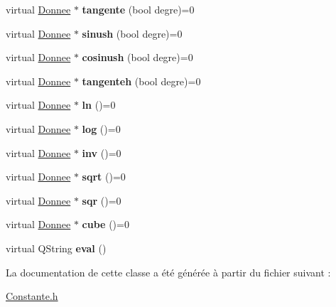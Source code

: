 \begin{DoxyCompactItemize}
\item 
\hypertarget{class_constante_a586760fc3789d45d2fc22c63d5ac0679}{virtual \hyperlink{class_donnee}{Donnee} $\ast$ {\bfseries tangente} (bool degre)=0}\label{class_constante_a586760fc3789d45d2fc22c63d5ac0679}

\item 
\hypertarget{class_constante_a630282a8ee4ff579615eecf06c2bff81}{virtual \hyperlink{class_donnee}{Donnee} $\ast$ {\bfseries sinush} (bool degre)=0}\label{class_constante_a630282a8ee4ff579615eecf06c2bff81}

\item 
\hypertarget{class_constante_af447d1a704ccd3855741328c4ff97300}{virtual \hyperlink{class_donnee}{Donnee} $\ast$ {\bfseries cosinush} (bool degre)=0}\label{class_constante_af447d1a704ccd3855741328c4ff97300}

\item 
\hypertarget{class_constante_a32e1d620c11e78b8318383924a5e9774}{virtual \hyperlink{class_donnee}{Donnee} $\ast$ {\bfseries tangenteh} (bool degre)=0}\label{class_constante_a32e1d620c11e78b8318383924a5e9774}

\item 
\hypertarget{class_constante_a63658ad4998f3b122b9f4f9f02a4f525}{virtual \hyperlink{class_donnee}{Donnee} $\ast$ {\bfseries ln} ()=0}\label{class_constante_a63658ad4998f3b122b9f4f9f02a4f525}

\item 
\hypertarget{class_constante_a6d96efcf73d825f28c9d3d155ecc983a}{virtual \hyperlink{class_donnee}{Donnee} $\ast$ {\bfseries log} ()=0}\label{class_constante_a6d96efcf73d825f28c9d3d155ecc983a}

\item 
\hypertarget{class_constante_ae7a6e1a008b871e48dca3923baa5514e}{virtual \hyperlink{class_donnee}{Donnee} $\ast$ {\bfseries inv} ()=0}\label{class_constante_ae7a6e1a008b871e48dca3923baa5514e}

\item 
\hypertarget{class_constante_a3e057173655eabe182ed4b8c09ad2ab0}{virtual \hyperlink{class_donnee}{Donnee} $\ast$ {\bfseries sqrt} ()=0}\label{class_constante_a3e057173655eabe182ed4b8c09ad2ab0}

\item 
\hypertarget{class_constante_ae106a1a6e582a5779a1dac6c0fc037b4}{virtual \hyperlink{class_donnee}{Donnee} $\ast$ {\bfseries sqr} ()=0}\label{class_constante_ae106a1a6e582a5779a1dac6c0fc037b4}

\item 
\hypertarget{class_constante_ac0df5e4a4d4116c36cd252abaaf9de3a}{virtual \hyperlink{class_donnee}{Donnee} $\ast$ {\bfseries cube} ()=0}\label{class_constante_ac0df5e4a4d4116c36cd252abaaf9de3a}

\item 
\hypertarget{class_constante_a6ead49eb4298a95ed7c90012e1b272ff}{virtual Q\-String {\bfseries eval} ()}\label{class_constante_a6ead49eb4298a95ed7c90012e1b272ff}

\end{DoxyCompactItemize}


La documentation de cette classe a été générée à partir du fichier suivant \-:\begin{DoxyCompactItemize}
\item 
\hyperlink{_constante_8h}{Constante.\-h}\end{DoxyCompactItemize}
